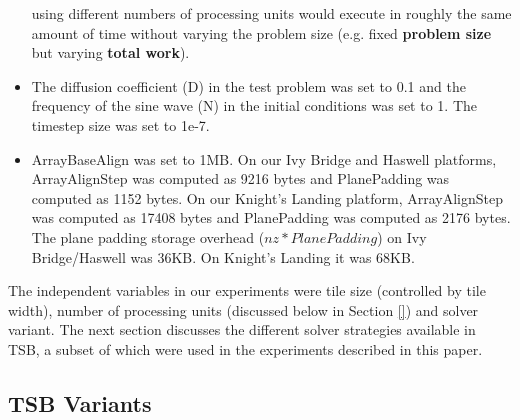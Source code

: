 \documentclass{sig-alternate-05-2015}
\begin{document}
\begin{itemize}
using different numbers of processing units would execute in roughly the same
amount of time without varying the problem size (e.g. fixed \textbf{problem
size} but varying \textbf{total work}).
\item The diffusion coefficient (D) in the test problem was set to 0.1 and the
frequency of the sine wave (N) in the initial conditions was set to 1. The
timestep size was set to 1e-7.
\item ArrayBaseAlign was set to 1MB. On our Ivy Bridge and Haswell platforms,
ArrayAlignStep was computed as 9216 bytes and PlanePadding was computed as 1152
bytes. On our Knight's Landing platform, ArrayAlignStep was computed as 17408
bytes and PlanePadding was computed as 2176 bytes. The plane padding storage
overhead (\(nz*PlanePadding\)) on Ivy Bridge/Haswell was 36KB. On Knight's
Landing it was 68KB.
\end{itemize}

The independent variables in our experiments were tile size (controlled by tile
width), number of processing units (discussed below in Section \ref{}) and
solver variant. The next section discusses the different solver strategies
available in TSB, a subset of which were used in the experiments described in
this paper.

\subsection{TSB Variants}
\label{sec:experimental_setup:tsb_variants}
\end{document}
